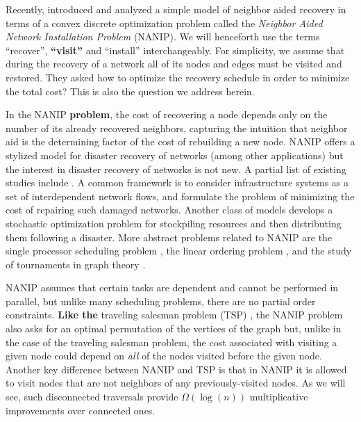 \documentclass[english]{llncs}
\newcommand{\chg}[1]{\textbf{\color{red} #1}}
\begin{document}
Recently, \cite{Gutfraind14} introduced and analyzed a simple
model of neighbor aided recovery in terms of a convex discrete optimization
problem called the \emph{Neighbor Aided Network Installation Problem} (NANIP).
We will henceforth use the terms ``recover'', \chg{``visit''} and ``install'' interchangeably.
For simplicity, we assume that during the recovery of a network all of its
nodes and edges must be visited and restored. They asked how to optimize the
recovery schedule in order to minimize the total cost?  This is also the
question we address herein.

In the NANIP \chg{problem}, the cost of recovering a node depends only on the number of
its already recovered neighbors, capturing the intuition that neighbor aid is
the determining factor of the cost of rebuilding a new node.  NANIP offers a
stylized model for disaster recovery of networks (among other applications) but
the interest in disaster recovery of networks is not new.  A partial list of
existing studies include
\cite{Guha99,nurre2010restoring,Lee07,Adibi94,Bertoli02,coffrin2011strategic}.
A common framework is to consider infrastructure systems as a set of
interdependent network flows, and formulate the problem of minimizing the cost
of repairing such damaged networks.  Another class of models
\cite{Hentenryck10} develops a stochastic optimization problem for stockpiling
resources and then distributing them following a disaster.  More abstract
problems related to NANIP are the single processor scheduling problem
\cite{Karp61}, the linear ordering problem \cite{Mitchell96}, and the study of
tournaments in graph theory \cite{West01}.  

NANIP assumes that certain tasks are dependent and cannot be performed in
parallel, but unlike many scheduling problems, there are no partial order
constraints.  \chg{Like the} traveling salesman problem (TSP)
\cite{schrijver2005history}, the NANIP problem also asks for an optimal
permutation of the vertices of the graph but, unlike in the case of the
traveling salesman problem, the cost associated with visiting a given node
could depend on \emph{all} of the nodes visited before the given node. Another
key difference between NANIP and TSP is that in NANIP it is allowed to visit
nodes that are not neighbors of any previously-visited nodes. As we will see,
such disconnected traversals provide $\Omega(\log(n))$ multiplicative
improvements over connected ones.
\end{document}
